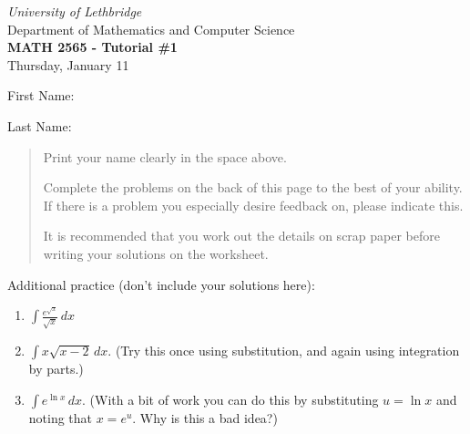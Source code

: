\documentclass[12pt]{article}
\newcommand{\skipline}{\vspace{12pt}}
\newcommand{\di}{\displaystyle}
\begin{document}
\author{Instructor: Sean Fitzpatrick}
\thispagestyle{empty}
\begin{center}
\emph{University of Lethbridge}\\
Department of Mathematics and Computer Science\\
{\bf MATH 2565 - Tutorial \#1}\\
Thursday, January 11
\end{center}
\skipline \skipline \skipline \noindent \skipline

\skipline
First Name:\underline{\hspace{348pt}}\\
\skipline

\vspace{1cm}

Last Name:\underline{\hspace{351pt}}



\vspace{1cm}

\begin{quote}
Print your name clearly in the space above. 

\medskip

Complete the problems on the back of this page to the best of your ability. If there is a problem you especially desire feedback on, please indicate this. 

\medskip

It is recommended that you work out the details on scrap paper before writing your solutions on the worksheet.
\end{quote}

\vspace{2cm}


Additional practice (don't include your solutions here):
\begin{enumerate}
 \item  $\di \int \frac{e^{\sqrt{x}}}{\sqrt{x}}\,dx$
 \item $\di \int x\sqrt{x-2}\,dx$. (Try this once using substitution, and again using integration by parts.)

 \item $\di \int e^{\ln x}\,dx$. (With a bit of work you can do this by substituting $u=\ln x$ and noting that $x=e^u$. Why is this a bad idea?)
\end{enumerate}  
\end{document}
